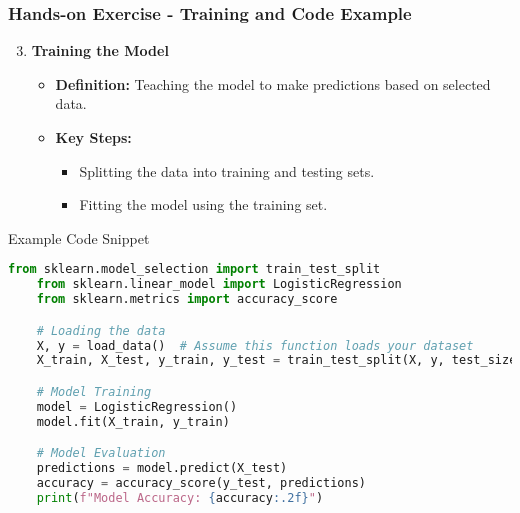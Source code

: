 \documentclass{beamer}
\begin{document}
\begin{frame}[fragile]
    \frametitle{Hands-on Exercise - Training and Code Example}
    \begin{enumerate}
        \setcounter{enumi}{2}
        \item \textbf{Training the Model}
            \begin{itemize}
                \item \textbf{Definition:} Teaching the model to make predictions based on selected data.
                \item \textbf{Key Steps:}
                    \begin{itemize}
                        \item Splitting the data into training and testing sets.
                        \item Fitting the model using the training set.
                    \end{itemize}
            \end{itemize}
    \end{enumerate}

    \begin{block}{Example Code Snippet}
    \begin{lstlisting}[language=Python]
    from sklearn.model_selection import train_test_split
    from sklearn.linear_model import LogisticRegression
    from sklearn.metrics import accuracy_score

    # Loading the data
    X, y = load_data()  # Assume this function loads your dataset
    X_train, X_test, y_train, y_test = train_test_split(X, y, test_size=0.2)

    # Model Training
    model = LogisticRegression()
    model.fit(X_train, y_train)

    # Model Evaluation
    predictions = model.predict(X_test)
    accuracy = accuracy_score(y_test, predictions)
    print(f"Model Accuracy: {accuracy:.2f}")
    \end{lstlisting}
    \end{block}
\end{frame}
\end{document}
